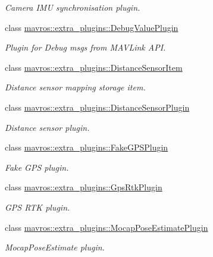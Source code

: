\begin{DoxyCompactItemize}
\begin{DoxyCompactList}\small\item\em Camera I\+MU synchronisation plugin. \end{DoxyCompactList}\item 
class \mbox{\hyperlink{classmavros_1_1extra__plugins_1_1DebugValuePlugin}{mavros\+::extra\+\_\+plugins\+::\+Debug\+Value\+Plugin}}
\begin{DoxyCompactList}\small\item\em Plugin for Debug msgs from M\+A\+V\+Link A\+PI. \end{DoxyCompactList}\item 
class \mbox{\hyperlink{classmavros_1_1extra__plugins_1_1DistanceSensorItem}{mavros\+::extra\+\_\+plugins\+::\+Distance\+Sensor\+Item}}
\begin{DoxyCompactList}\small\item\em Distance sensor mapping storage item. \end{DoxyCompactList}\item 
class \mbox{\hyperlink{classmavros_1_1extra__plugins_1_1DistanceSensorPlugin}{mavros\+::extra\+\_\+plugins\+::\+Distance\+Sensor\+Plugin}}
\begin{DoxyCompactList}\small\item\em Distance sensor plugin. \end{DoxyCompactList}\item 
class \mbox{\hyperlink{classmavros_1_1extra__plugins_1_1FakeGPSPlugin}{mavros\+::extra\+\_\+plugins\+::\+Fake\+G\+P\+S\+Plugin}}
\begin{DoxyCompactList}\small\item\em Fake G\+PS plugin. \end{DoxyCompactList}\item 
class \mbox{\hyperlink{classmavros_1_1extra__plugins_1_1GpsRtkPlugin}{mavros\+::extra\+\_\+plugins\+::\+Gps\+Rtk\+Plugin}}
\begin{DoxyCompactList}\small\item\em G\+PS R\+TK plugin. \end{DoxyCompactList}\item 
class \mbox{\hyperlink{classmavros_1_1extra__plugins_1_1MocapPoseEstimatePlugin}{mavros\+::extra\+\_\+plugins\+::\+Mocap\+Pose\+Estimate\+Plugin}}
\begin{DoxyCompactList}\small\item\em Mocap\+Pose\+Estimate plugin. \end{DoxyCompactList}\item 

\end{DoxyCompactItemize}
